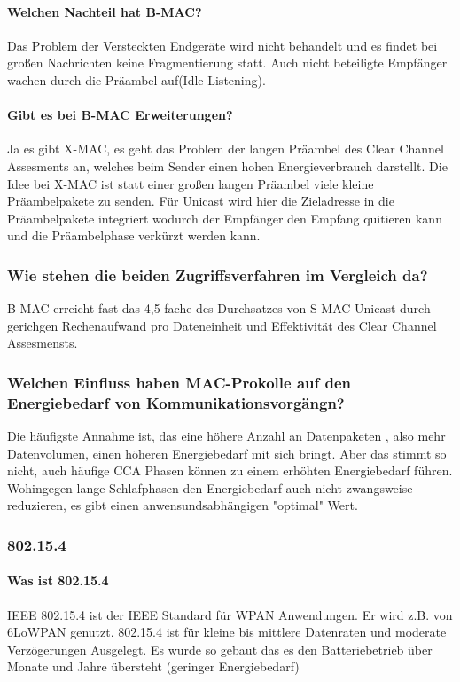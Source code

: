 	\paragraph{Welchen Nachteil hat B-MAC?}
	Das Problem der Versteckten Endgeräte wird nicht behandelt und es findet bei großen Nachrichten keine Fragmentierung statt. Auch nicht beteiligte Empfänger wachen durch die Präambel auf(Idle Listening). 
	
	\paragraph{Gibt es bei B-MAC Erweiterungen?}
	Ja es gibt X-MAC, es geht das Problem der langen Präambel des Clear Channel Assesments an, welches beim Sender einen hohen Energieverbrauch darstellt. Die Idee bei X-MAC ist statt einer großen langen Präambel viele kleine Präambelpakete zu senden. 
	Für Unicast wird hier die Zieladresse in die Präambelpakete integriert wodurch der Empfänger den Empfang quitieren kann und die Präambelphase verkürzt werden kann.
	
	
	\subsubsection{Wie stehen die beiden Zugriffsverfahren im Vergleich da?}
	B-MAC erreicht fast das 4,5 fache des Durchsatzes von S-MAC Unicast durch gerichgen Rechenaufwand pro Dateneinheit und Effektivität des Clear Channel Assesmensts.
	
	\subsubsection{Welchen Einfluss haben MAC-Prokolle auf den Energiebedarf von Kommunikationsvorgängn?}
	Die häufigste Annahme ist, das eine höhere Anzahl an Datenpaketen  , also mehr Datenvolumen, einen höheren Energiebedarf mit sich bringt. Aber das stimmt so nicht, auch häufige CCA Phasen können zu einem erhöhten Energiebedarf führen. Wohingegen lange Schlafphasen den Energiebedarf auch nicht zwangsweise reduzieren, es gibt einen anwensundsabhängigen "optimal" Wert.
	
\subsubsection{802.15.4}
	\paragraph{Was ist 802.15.4}
	IEEE 802.15.4 ist der IEEE Standard für WPAN Anwendungen. Er wird z.B. von 6LoWPAN genutzt.
	802.15.4 ist für kleine bis mittlere Datenraten und moderate Verzögerungen Ausgelegt. Es wurde so gebaut das es den Batteriebetrieb über Monate und Jahre übersteht (geringer Energiebedarf)
	
